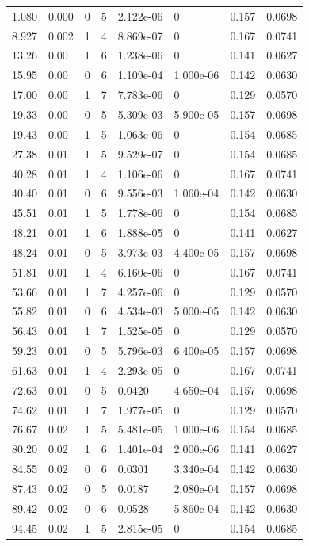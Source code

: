 \documentclass[preview]{standalone}
\begin{document}
{{\begin{tabular}{L{1.2cm}C{1.2cm} C{0.3cm}C{0.5cm} C{1.4cm}C{1.4cm} C{1.4cm}C{1.4cm}}
  1.080  &  0.000  & 0     &  5 &  2.122e-06  & 0  & 0.157 &  0.0698   \\ 
  8.927  &  0.002  & 1     &  4 &  8.869e-07  & 0  & 0.167 &  0.0741   \\ 
  13.26  &  0.00  & 1     &  6 &  1.238e-06  & 0  & 0.141 &  0.0627   \\ 
  15.95  &  0.00  & 0     &  6 &  1.109e-04  & 1.000e-06  & 0.142 &  0.0630   \\ 
  17.00  &  0.00  & 1     &  7 &  7.783e-06  & 0  & 0.129 &  0.0570   \\ 
  19.33  &  0.00  & 0     &  5 &  5.309e-03  & 5.900e-05  & 0.157 &  0.0698   \\ 
  19.43  &  0.00  & 1     &  5 &  1.063e-06  & 0  & 0.154 &  0.0685   \\ 
  27.38  &  0.01  & 1     &  5 &  9.529e-07  & 0  & 0.154 &  0.0685   \\ 
  40.28  &  0.01  & 1     &  4 &  1.106e-06  & 0  & 0.167 &  0.0741   \\ 
  40.40  &  0.01  & 0     &  6 &  9.556e-03  & 1.060e-04  & 0.142 &  0.0630   \\ 
  45.51  &  0.01  & 1     &  5 &  1.778e-06  & 0  & 0.154 &  0.0685   \\ 
  48.21  &  0.01  & 1     &  6 &  1.888e-05  & 0  & 0.141 &  0.0627   \\ 
  48.24  &  0.01  & 0     &  5 &  3.973e-03  & 4.400e-05  & 0.157 &  0.0698   \\ 
  51.81  &  0.01  & 1     &  4 &  6.160e-06  & 0  & 0.167 &  0.0741   \\ 
  53.66  &  0.01  & 1     &  7 &  4.257e-06  & 0  & 0.129 &  0.0570   \\ 
  55.82  &  0.01  & 0     &  6 &  4.534e-03  & 5.000e-05  & 0.142 &  0.0630   \\ 
  56.43  &  0.01  & 1     &  7 &  1.525e-05  & 0  & 0.129 &  0.0570   \\ 
  59.23  &  0.01  & 0     &  5 &  5.796e-03  & 6.400e-05  & 0.157 &  0.0698   \\ 
  61.63  &  0.01  & 1     &  4 &  2.293e-05  & 0  & 0.167 &  0.0741   \\ 
  72.63  &  0.01  & 0     &  5 &  0.0420  & 4.650e-04  & 0.157 &  0.0698   \\ 
  74.62  &  0.01  & 1     &  7 &  1.977e-05  & 0  & 0.129 &  0.0570   \\ 
  76.67  &  0.02  & 1     &  5 &  5.481e-05  & 1.000e-06  & 0.154 &  0.0685   \\ 
  80.20  &  0.02  & 1     &  6 &  1.401e-04  & 2.000e-06  & 0.141 &  0.0627   \\ 
  84.55  &  0.02  & 0     &  6 &  0.0301  & 3.340e-04  & 0.142 &  0.0630   \\ 
  87.43  &  0.02  & 0     &  5 &  0.0187  & 2.080e-04  & 0.157 &  0.0698   \\ 
  89.42  &  0.02  & 0     &  6 &  0.0528  & 5.860e-04  & 0.142 &  0.0630   \\ 
  94.45  &  0.02  & 1     &  5 &  2.815e-05  & 0  & 0.154 &  0.0685   \\ 
\hline 
\end{tabular} 

}}
\end{document}
